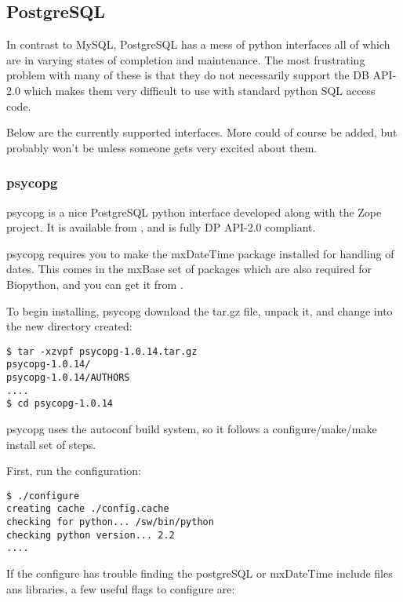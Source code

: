 \documentclass{article}
\begin{document}
\subsection{PostgreSQL}

In contrast to MySQL, PostgreSQL has a mess of python interfaces all of
which are in varying states of completion and maintenance. The most
frustrating problem with many of these is that they do not necessarily
support the DB API-2.0 which makes them very difficult to use with
standard python SQL access code.


Below are the currently supported interfaces. More could of course be
added, but probably won't be unless someone gets very excited about
them.

\subsubsection{psycopg} 

psycopg is a nice PostgreSQL python interface developed along with the
Zope project. It is available from 
, and is fully
DP API-2.0 compliant.


psycopg requires you to make the mxDateTime package installed for
handling of dates. This comes in the mxBase set of packages which are
also required for Biopython, and you can get it from
.


To begin installing, psycopg download the tar.gz file, unpack it, and
change into the new directory created:

\begin{verbatim}
$ tar -xzvpf psycopg-1.0.14.tar.gz 
psycopg-1.0.14/
psycopg-1.0.14/AUTHORS
....
$ cd psycopg-1.0.14
\end{verbatim}

psycopg uses the autoconf build system, so it follows a
configure/make/make install set of steps.

First, run the configuration:

\begin{verbatim}
$ ./configure
creating cache ./config.cache
checking for python... /sw/bin/python
checking python version... 2.2
....
\end{verbatim}

If the configure has trouble finding the postgreSQL or mxDateTime
include files ans libraries, a few useful flags to configure are:
\end{document}
